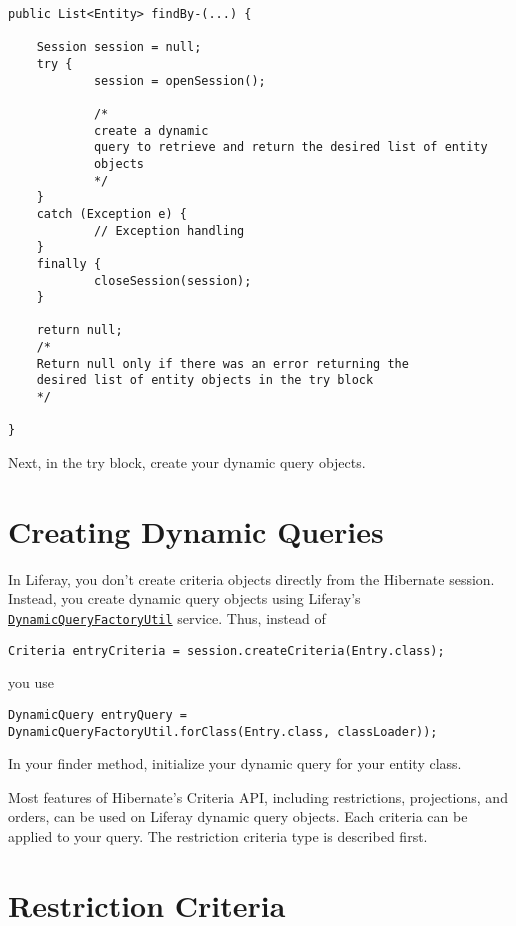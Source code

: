 \begin{verbatim}
public List<Entity> findBy-(...) {

    Session session = null;
    try {
            session = openSession();
            
            /*
            create a dynamic
            query to retrieve and return the desired list of entity
            objects
            */
    }
    catch (Exception e) {
            // Exception handling
    }
    finally {
            closeSession(session);
    }

    return null;
    /*
    Return null only if there was an error returning the
    desired list of entity objects in the try block
    */

}
\end{verbatim}

Next, in the try block, create your dynamic query objects.

\section{Creating Dynamic Queries}\label{creating-dynamic-queries}

In Liferay, you don't create criteria objects directly from the
Hibernate session. Instead, you create dynamic query objects using
Liferay's
\href{https://docs.liferay.com/dxp/portal/7.2-latest/javadocs/portal-kernel/com/liferay/portal/kernel/dao/orm/DynamicQueryFactoryUtil.html}{\texttt{DynamicQueryFactoryUtil}}
service. Thus, instead of

\begin{verbatim}
Criteria entryCriteria = session.createCriteria(Entry.class);
\end{verbatim}

you use

\begin{verbatim}
DynamicQuery entryQuery = DynamicQueryFactoryUtil.forClass(Entry.class, classLoader));
\end{verbatim}

In your finder method, initialize your dynamic query for your entity
class.

Most features of Hibernate's Criteria API, including restrictions,
projections, and orders, can be used on Liferay dynamic query objects.
Each criteria can be applied to your query. The restriction criteria
type is described first.

\section{Restriction Criteria}\label{restriction-criteria}

